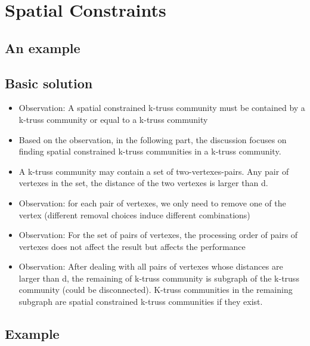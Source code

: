 \documentclass{beamer}
\begin{document}
\section{Spatial Constraints}

\subsection{An example}
\begin{frame}
\end{frame}

\subsection{Basic solution}
\begin{frame}
\begin{itemize}
\item Observation: A spatial constrained k-truss community must be contained by a k-truss community or equal to a k-truss community 
\item Based on the observation, in the following part, the discussion focuses on finding spatial constrained k-truss communities in a k-truss community.
\item A k-truss community may contain a set of two-vertexes-pairs. Any pair of vertexes in the set, the distance of the two vertexes is larger than d.
\item Observation: for each pair of vertexes, we only need to remove one of the vertex (different removal choices induce different combinations)
\item Observation: For the set of pairs of vertexes, the processing order of pairs of vertexes does not affect the result but affects the performance
\item Observation: After dealing with all pairs of vertexes whose distances are larger than d, the remaining of k-truss community is subgraph of the k-truss community (could be disconnected).
K-truss communities in the remaining subgraph are spatial constrained k-truss communities if they exist.
\end{itemize}
\end{frame}

\subsection{Example}
\begin{frame}

\end{frame}
\end{document}

